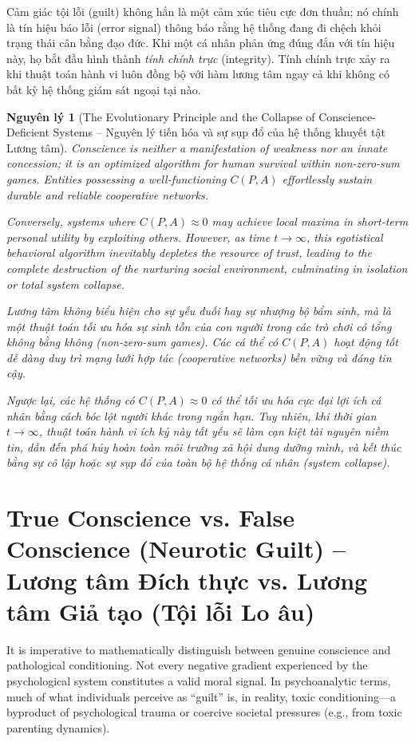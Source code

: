 \documentclass{report}
\newtheorem{nguyenly}{Nguyên lý}
\begin{document}
Cảm giác tội lỗi (guilt) không hẳn là một cảm xúc tiêu cực đơn thuần; nó chính là tín hiệu báo lỗi (error signal) thông báo rằng hệ thống đang đi chệch khỏi trạng thái cân bằng đạo đức. Khi một cá nhân phản ứng đúng đắn với tín hiệu này, họ bắt đầu hình thành \emph{tính chính trực} (integrity). Tính chính trực xảy ra khi thuật toán hành vi luôn đồng bộ với hàm lương tâm ngay cả khi không có bất kỳ hệ thống giám sát ngoại tại nào.

\begin{nguyenly}[The Evolutionary Principle and the Collapse of Conscience-Deficient Systems -- Nguyên lý tiến hóa và sự sụp đổ của hệ thống khuyết tật Lương tâm]
	Conscience is neither a manifestation of weakness nor an innate concession; it is an optimized algorithm for human survival within non-zero-sum games. Entities possessing a well-functioning $C(P,A)$ effortlessly sustain durable and reliable cooperative networks.
	
	Conversely, systems where $C(P,A) \approx 0$ may achieve local maxima in short-term personal utility by exploiting others. However, as time $t \to \infty$, this egotistical behavioral algorithm inevitably depletes the resource of trust, leading to the complete destruction of the nurturing social environment, culminating in isolation or total system collapse.
	
	Lương tâm không biểu hiện cho sự yếu đuối hay sự nhượng bộ bẩm sinh, mà là một thuật toán tối ưu hóa sự sinh tồn của con người trong các trò chơi có tổng không bằng không (non-zero-sum games). Các cá thể có $C(P,A)$ hoạt động tốt dễ dàng duy trì mạng lưới hợp tác (cooperative networks) bền vững và đáng tin cậy. 
	
	Ngược lại, các hệ thống có $C(P,A) \approx 0$ có thể tối ưu hóa cực đại lợi ích cá nhân bằng cách bóc lột người khác trong ngắn hạn. Tuy nhiên, khi thời gian $t \to \infty$, thuật toán hành vi ích kỷ này tất yếu sẽ làm cạn kiệt tài nguyên niềm tin, dẫn đến phá hủy hoàn toàn môi trường xã hội dung dưỡng mình, và kết thúc bằng sự cô lập hoặc sự sụp đổ của toàn bộ hệ thống cá nhân (system collapse).
\end{nguyenly}

\section{True Conscience vs. False Conscience (Neurotic Guilt) -- Lương tâm Đích thực vs. Lương tâm Giả tạo (Tội lỗi Lo âu)}

It is imperative to mathematically distinguish between genuine conscience and pathological conditioning. Not every negative gradient experienced by the psychological system constitutes a valid moral signal. In psychoanalytic terms, much of what individuals perceive as ``guilt'' is, in reality, toxic conditioning—a byproduct of psychological trauma or coercive societal pressures (e.g., from toxic parenting dynamics).
\end{document}
